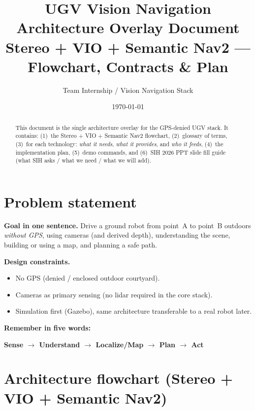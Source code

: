 \documentclass[11pt,a4paper]{article}
\title{\textbf{UGV Vision Navigation}\\[0.35em]
\large Architecture Overlay Document\\[0.15em]
\normalsize Stereo + VIO + Semantic Nav2 --- Flowchart, Contracts \& Plan}
\author{Team Internship / Vision Navigation Stack}
\date{\today}
\begin{document}
\maketitle

\begin{abstract}
\noindent
This document is the single architecture overlay for the GPS-denied UGV stack.
It contains: (1)~the Stereo + VIO + Semantic Nav2 flowchart,
(2)~glossary of terms,
(3)~for each technology: \emph{what it needs}, \emph{what it provides}, and \emph{who it feeds},
(4)~the implementation plan, (5)~demo commands, and
(6)~SIH 2026 PPT slide fill guide (what SIH asks / what we need / what we will add).
\end{abstract}

\tableofcontents
\newpage

\section{Problem statement}

\textbf{Goal in one sentence.}
Drive a ground robot from point~A to point~B outdoors \emph{without GPS}, using cameras (and derived depth), understanding the scene, building or using a map, and planning a safe path.

\textbf{Design constraints.}
\begin{itemize}[leftmargin=*]
  \item No GPS (denied / enclosed outdoor courtyard).
  \item Cameras as primary sensing (no lidar required in the core stack).
  \item Simulation first (Gazebo), same architecture transferable to a real robot later.
\end{itemize}

\textbf{Remember in five words:}
\begin{center}
\textbf{Sense $\rightarrow$ Understand $\rightarrow$ Localize/Map $\rightarrow$ Plan $\rightarrow$ Act}
\end{center}

\section{Architecture flowchart (Stereo + VIO + Semantic Nav2)}
\end{document}

